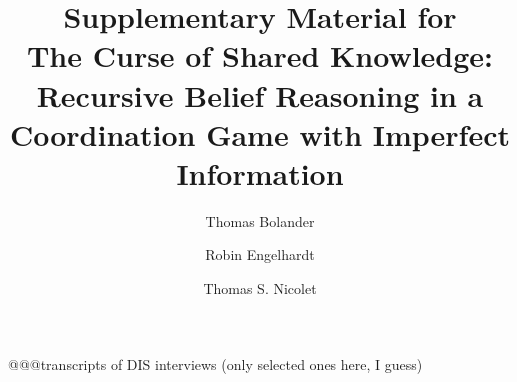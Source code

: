 \documentclass[a4paper,superscriptaddress,nofootinbib]{revtex4}
\begin{document}
\title{Supplementary Material for \\
The Curse of Shared Knowledge: Recursive Belief Reasoning in a Coordination Game with Imperfect Information}
\author{Thomas Bolander}
\author{Robin Engelhardt}
\author{Thomas S. Nicolet}

\maketitle

@@@transcripts of DIS interviews (only selected ones here, I guess)
\end{document}
